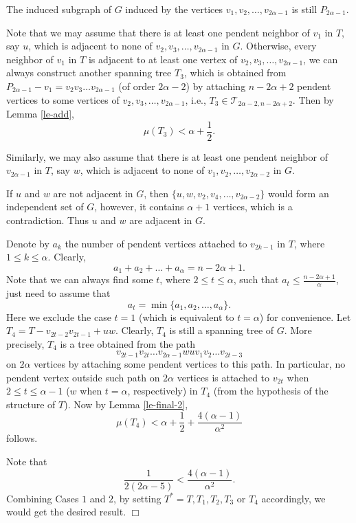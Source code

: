 \documentclass[10pt,a4paper]{amsart}
\newenvironment {Proof} {\noindent {\bf Proof.}}{\hspace*{\fill}$\Box$\par\vspace{4mm}}
\begin{document}
\begin{Proof}
 The induced subgraph of $G$ induced by the vertices $v_1, v_2, \dots, v_{2\alpha-1}$ is still $P_{2\alpha-1}$.

Note that we may assume that there is at least one pendent neighbor of $v_1$ in $T$, say $u$, which is adjacent to none of $v_2, v_3, \dots, v_{2\alpha-1}$ in $G$. Otherwise,
every neighbor of $v_1$ in $T$ is adjacent to at least one vertex of $v_2, v_3, \dots, v_{2\alpha-1}$,
we can always construct another spanning tree $T_3$, which is obtained from $P_{2\alpha-1}- v_1 = v_2 v_3 \dots v_{2\alpha-1}$ (of order $2\alpha-2$) by attaching $n - 2\alpha + 2$ pendent vertices to some vertices of $ v_2, v_3, \dots, v_{2\alpha-1}$, i.e., $T_3 \in \mathcal{T}_{2\alpha-2,n - 2\alpha + 2}$. Then by Lemma \ref{le-add},
$$
\mu (T_3) < \alpha + \frac{1}{2}.
$$

Similarly, we may also assume that there is at least one pendent neighbor of $v_{2\alpha-1}$ in $T$, say $w$, which is adjacent to none of $v_1, v_2, \dots, v_{2\alpha-2}$ in $G$.

If $u$ and $w$ are not adjacent in $G$, then $\{u, w, v_2, v_4, \dots, v_{2\alpha-2}\}$ would form an independent set of $G$, however, it contains $\alpha + 1$ vertices, which is a contradiction. Thus $u$ and $w$ are adjacent in $G$.

Denote by $a_k$ the number of pendent vertices attached to $v_{2k-1}$ in $T$, where $1 \le k \le \alpha$. Clearly,
$$
a_1 + a_2 + \dots + a_{\alpha} = n - 2 \alpha + 1.
$$
Note that we can always find some $t$, where $2 \le t \le \alpha$, such that $a_t \le \frac{n - 2 \alpha + 1}{\alpha}$, just need to assume that
$$
a_t = \min \{ a_1, a_2, \dots, a_{\alpha} \}.
$$
Here we exclude the case $t = 1$ (which is equivalent to $t = \alpha$) for convenience.
Let $T_4 = T - v_{2t - 2} v_{2t - 1} + u w$. Clearly, $T_4$ is still a spanning tree of $G$. More precisely, $T_4$ is a tree obtained from the path
$$
v_{2t-1} v_{2t} \dots v_{2\alpha - 1} w u v_1 v_2 \dots v_{2t - 3}
$$
on $2\alpha$ vertices by attaching some pendent vertices to this path. In particular, no pendent vertex outside such path on $2\alpha$ vertices is attached to $v_{2t}$ when $2 \le t \le \alpha -1$ ($w$ when $t = \alpha$, respectively) in $T_4$ (from the hypothesis of the structure of $T$). Now by Lemma \ref{le-final-2},
$$
\mu (T_4) < \alpha + \frac{1}{2} + \frac{4(\alpha-1)}{\alpha^2}
$$
follows.


Note that
$$
\frac{1}{2(2\alpha-5)} < \frac{4(\alpha-1)}{\alpha^2}.
$$
Combining Cases $1$ and $2$, by setting $T^* = T, T_1, T_2, T_3$ or $T_4$ accordingly, we would get the desired result.
\end{Proof}
\end{document}
